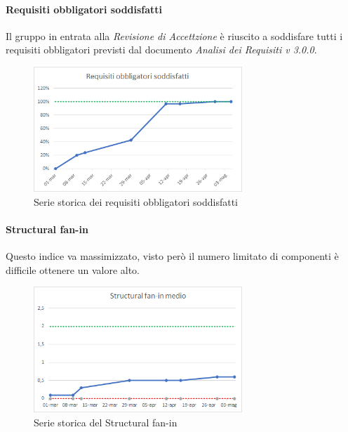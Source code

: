     \paragraph{Requisiti obbligatori soddisfatti} \Spazio
    Il gruppo in entrata alla \emph{Revisione di Accettzione} è riuscito a soddisfare tutti i requisiti obbligatori previsti dal documento \textit{Analisi dei Requisiti v 3.0.0}.
    \begin{figure}[H]
    	\centering 
    	\includegraphics[width=0.7\textwidth]{Images/obbl.png}
    	\caption{Serie storica dei requisiti obbligatori soddisfatti}
    	\label{obbl} 
    \end{figure}
    \paragraph{Structural fan-in} \Spazio
    Questo indice va massimizzato, visto però il numero limitato di componenti è difficile ottenere un valore alto.
    \begin{figure}[H]
    	\centering 
    	\includegraphics[width=0.7\textwidth]{Images/SFIN.png}
    	\caption{Serie storica del Structural fan-in}
    	\label{SFIN} 
    \end{figure}
